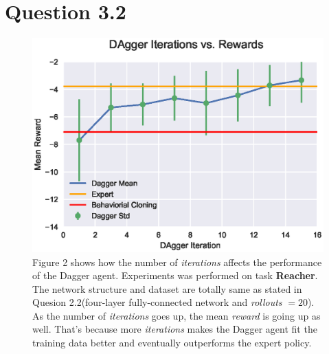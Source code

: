 \documentclass[12pt]{article}
\begin{document}
\newpage

\section{Question 3.2}
\begin{figure}[!h]
\centering
\includegraphics[width=5in]{3-2.eps}
\caption{Figure 2 shows how the number of {\em iterations} affects the performance of the Dagger agent. Experiments was performed on task {\bf Reacher}. The network structure and dataset are totally same as stated in Quesion 2.2(four-layer fully-connected network and {\em rollouts} $= 20$). As the number of {\em iterations} goes up, the mean {\em reward} is going up as well. That's because more {\em iterations} makes the Dagger agent fit the training data better and eventually outperforms the expert policy.}
\end{figure}
\end{document}
